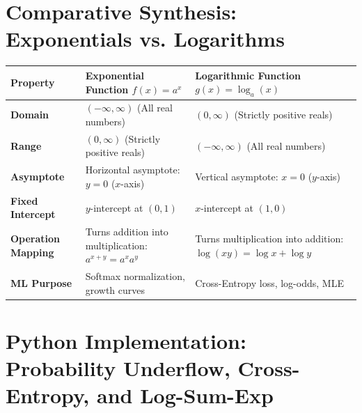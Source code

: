 \section{Comparative Synthesis: Exponentials vs. Logarithms}

\begin{center}
\renewcommand{\arraystretch}{1.3}
\begin{tabular}{p{3.2cm}p{4.2cm}p{4.0cm}}
\toprule
\textbf{Property} & \textbf{Exponential Function $f(x) = a^x$} & \textbf{Logarithmic Function $g(x) = \log_a(x)$} \\
\midrule
\textbf{Domain} & $(-\infty, \infty)$ (All real numbers) & $(0, \infty)$ (Strictly positive reals) \\
\textbf{Range} & $(0, \infty)$ (Strictly positive reals) & $(-\infty, \infty)$ (All real numbers) \\
\textbf{Asymptote} & Horizontal asymptote: $y = 0$ ($x$-axis) & Vertical asymptote: $x = 0$ ($y$-axis) \\
\textbf{Fixed Intercept} & $y$-intercept at $(0, 1)$ & $x$-intercept at $(1, 0)$ \\
\textbf{Operation Mapping} & Turns addition into multiplication: $a^{x+y} = a^x a^y$ & Turns multiplication into addition: $\log(xy) = \log x + \log y$ \\
\textbf{ML Purpose} & Softmax normalization, growth curves & Cross-Entropy loss, log-odds, MLE \\
\bottomrule
\end{tabular}
\end{center}

\section{Python Implementation: Probability Underflow, Cross-Entropy, and Log-Sum-Exp}

